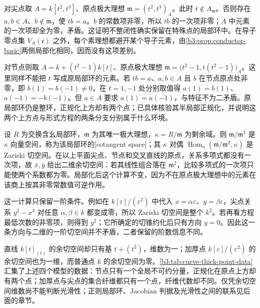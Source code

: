 对尖点取 \(A=k[t^2,t^3]\)、原点极大理想 \(\mathfrak m=(t^2,t^3)_A\)。此时 \(t\notin A_{\mathfrak m}\)。否则存在 \(a,b\in A\)、\(b\notin\mathfrak m\)，使 \(tb=a\)。\(b\) 的常数项非零，所以 \(tb\) 的一次项非零；\(A\) 中元素的一次项却全为零，矛盾。这证明不整闭性确实保留在特殊点的局部环中。在导子零点集 \(V_A(\mathfrak c)\) 之外，每个素理想都避开某个导子元素，由\cref{b3:prop:conductor-basic}两侧局部化相同，因而没有这项差别。

\ProseParagraphBreak
对节点则取 \(A=k+(t^2-1)k[t]\)、原点极大理想 \(\mathfrak m=\bigl(t^2-1,t(t^2-1)\bigr)_A\)。这里同样不能把 \(t\) 写成原局部环的元素。若 \(tb=a\)、\(a,b\in A\) 且 \(b\) 在节点原点处非零，即 \(b(1)=b(-1)\ne0\)，在 \(t=1,-1\) 处分别取值得 \(a(1)=b(1)\)、\(a(-1)=-b(-1)\)。但 \(a\in A\) 要求 \(a(1)=a(-1)\)，与特征不为二矛盾。原局部环仍是整环，正规化上方却有两个点；已具体核验其半局部正规化，并说明这两个上方点与形式方程的两条分支分别属于什么环境。

\ProseParagraphBreak
设 \(R\) 为交换含幺局部环，\(\mathfrak m\) 为其唯一极大理想，\(\kappa=R/\mathfrak m\) 为剩余域。则 \(\mathfrak m/\mathfrak m^2\) 是 \(\kappa\) 向量空间，称为该局部环的[cotangent space]；其 \(\kappa\) 对偶 \(\operatorname{Hom}_{\kappa}(\mathfrak m/\mathfrak m^2,\kappa)\) 是 Zariski 切空间。在以上平面尖点、节点和交叉直线的原点，关系多项式都没有一次项，故 \(\bar x,\bar y\) 给出二维余切空间：若其线性组合落在 \(\mathfrak m^2\)，比较多项式的一次项只能使两个系数都为零。局部化后这个计算不变，因为不在原点极大理想中的元素在该商上按其非零常数值可逆作用。

这一计算只保留一阶条件。例如在 \(k[\varepsilon]/(\varepsilon^2)\) 中代入 \(x=\alpha\varepsilon\)、\(y=\beta\varepsilon\)，尖点关系 \(y^2-x^3\) 对任意 \(\alpha,\beta\in k\) 都变成零，所以 Zariski 切空间是整个 \(k^2\)。若再看方程最低次数的非零项，则得到 \(y^2\)；它所确定的切锥约化后只有方向 \(y=0\)。因此这一条方向与二维的一阶切空间并不矛盾，二者保留的阶数信息不同。

\ProseParagraphBreak
直线 \(k[t]_{(t)}\) 的余切空间却只有基 \(t+(t^2)\)，维数为一；加厚点 \(k[\varepsilon]/(\varepsilon^2)\) 的余切空间也为一维，而普通点 \(k\) 的余切空间为零。\cref{b3:tab:curve-thick-point-data}汇集了上述四个模型的数据：节点只有一个全局不可约分量，正规化在原点上方却有两个点；加厚点与尖点的集合纤维都只有一个点，纤维代数却不同。仅凭余切空间维数尚不能判断光滑性；正则局部环、Jacobian 判据及光滑性之间的联系见后面的章节。

